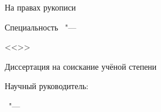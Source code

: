 

\thispagestyle{empty}
\begin{center}
	\thesisFirstOrganization
	
	\ifdefined\thesisSecondOrganization
		\thesisSecondOrganization
	\fi
\end{center}


\vspace{0pt plus4fill} 
\begin{flushright}
	На правах рукописи
\end{flushright}


\vspace{0pt plus6fill} 
\begin{center}
	{\large \thesisAuthor}
\end{center}


\vspace{0pt plus1fill} 
\begin{center}
	\textbf {\large \MakeUppercase \thesisTitle}
	
	\vspace{0pt plus2fill} 
	Специальность \thesisSpecialtyNumber\ "---

	<<\thesisSpecialtyTitle>>
	
	\vspace{0pt plus2fill} 
	Диссертация на соискание учёной степени
	
	\thesisDegree
\end{center}


\vspace{0pt plus4fill} 
\begin{flushright}
	Научный руководитель:

	\supervisorRegalia

	\ifdefined\supervisorDead
		\framebox{\supervisorFio}
	\else
		\supervisorFio
	\fi
\end{flushright}


\vspace{0pt plus4fill} 
{\centering\thesisCity\ "--- \thesisYear\par}
